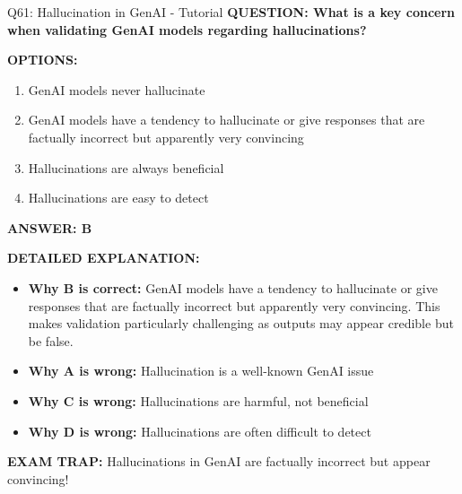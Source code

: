 \documentclass[8pt]{beamer}
\begin{document}
	\begin{frame}{Q61: Hallucination in GenAI - Tutorial}
		\fontsize{6.5}{7.5}\selectfont
		\textbf{QUESTION: What is a key concern when validating GenAI models regarding hallucinations?}
		
		\vspace{0.1cm}
		\textbf{OPTIONS:}
		\begin{enumerate}
			\item GenAI models never hallucinate
			\item GenAI models have a tendency to hallucinate or give responses that are factually incorrect but apparently very convincing
			\item Hallucinations are always beneficial
			\item Hallucinations are easy to detect
		\end{enumerate}
		
		\vspace{0.1cm}
		\textcolor{myblue}{\textbf{ANSWER: B}}
		
		\vspace{0.1cm}
		\textbf{DETAILED EXPLANATION:}
		\begin{itemize}
			\item \textbf{Why B is correct:} GenAI models have a tendency to hallucinate or give responses that are factually incorrect but apparently very convincing. This makes validation particularly challenging as outputs may appear credible but be false.
			\item \textbf{Why A is wrong:} Hallucination is a well-known GenAI issue
			\item \textbf{Why C is wrong:} Hallucinations are harmful, not beneficial
			\item \textbf{Why D is wrong:} Hallucinations are often difficult to detect
		\end{itemize}
		
		\textcolor{myred}{\textbf{EXAM TRAP:}} Hallucinations in GenAI are \textcolor{myblue}{factually incorrect but appear convincing}!
	\end{frame}
	
\end{document}
